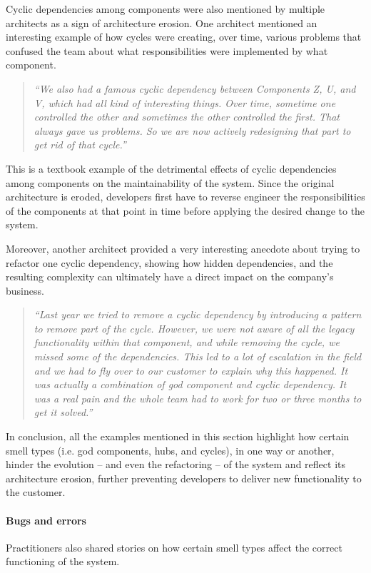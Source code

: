 Cyclic dependencies among components were also mentioned by multiple architects as a sign of architecture erosion.
One architect mentioned an interesting example of how cycles were creating, over time, various problems that confused the team about what responsibilities were implemented by what component.
\begin{quote}
    \emph{``We also had a famous cyclic dependency between Components Z, U, and V, which had all kind of interesting things. Over time, sometime one controlled the other and sometimes the other controlled the first. That always gave us problems. So we are now actively redesigning that part to get rid of that cycle.''}
\end{quote}
This is a textbook example of the detrimental effects of cyclic dependencies among components on the maintainability of the system. Since the original architecture is eroded, developers first have to reverse engineer the responsibilities of the components at that point in time before applying the desired change to the system.

Moreover, another architect provided a very interesting anecdote about trying to refactor one cyclic dependency, showing how hidden dependencies, and the resulting complexity can ultimately have a direct impact on the company's business.
\begin{quote}
    \emph{``Last year we tried to remove a cyclic dependency by introducing a pattern to remove part of the cycle. However, we were not aware of all the legacy functionality within that component, and while removing the cycle, we missed some of the dependencies. This led to a lot of escalation in the field and we had to fly over to our customer to explain why this happened. It was actually a combination of god component and cyclic dependency. It was a real pain and the whole team had to work for two or three months to get it solved.''}
\end{quote}

In conclusion, all the examples mentioned in this section highlight how certain smell types (i.e. god components, hubs, and cycles), in one way or another, hinder the evolution -- and even the refactoring -- of the system and reflect its architecture erosion, further preventing developers to deliver new functionality to the customer.

\paragraph{Bugs and errors}
Practitioners also shared stories on how certain smell types affect the correct functioning of the system.

